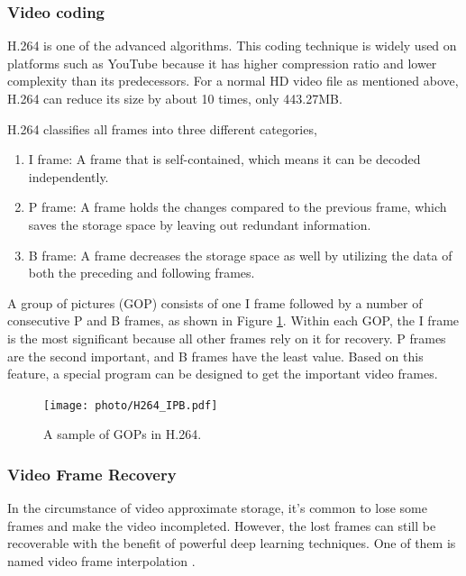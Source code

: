 \documentclass[sigconf]{acmart}
\begin{document}
\subsubsection{Video coding}
H.264 \cite{wiegand2003overview} is one of the advanced algorithms. This coding technique is widely used on platforms such as YouTube because it has higher compression ratio and lower complexity than its predecessors. For a normal HD video file as mentioned above, H.264 can reduce its size by about 10 times, only 443.27MB.

H.264 classifies all frames into three different categories,
\begin{enumerate}
    \item I frame: A frame that is self-contained, which means it can be decoded independently.
    \item P frame: A frame holds the changes compared to the previous frame, which saves the storage space by leaving out redundant information.
    \item B frame: A frame decreases the storage space as well by utilizing the data of both the preceding and following frames.
\end{enumerate}
A group of pictures (GOP) consists of one I frame followed by a number of consecutive P and B frames, as shown in Figure \ref{H264-IPB}.
Within each GOP, the I frame is the most significant because all other frames rely on it for recovery. P frames are the second important, and B frames have the least value.
Based on this feature, a special program can be designed to get the important video frames.

\begin{figure}[ht]
\centering
\texttt{[image: photo/H264\_IPB.pdf]}
\caption{A sample of GOPs in H.264.}
\label{H264-IPB}
\end{figure}


\subsubsection{Video Frame Recovery}
In the circumstance of video approximate storage, it's common to lose some frames and make the video incompleted. However, the lost frames can still be recoverable with the benefit of powerful deep learning techniques. One of them is named video frame interpolation \cite{meyer2015phase, niklaus2018context, van2017frame}.

\end{document}

